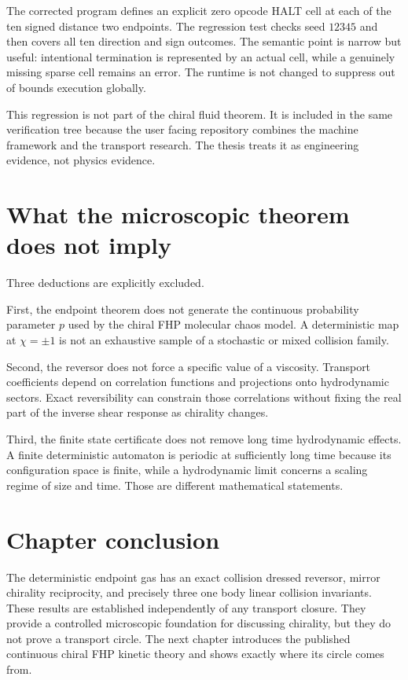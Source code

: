 The corrected program defines an explicit zero opcode HALT cell at each of the ten signed distance two endpoints. The regression test checks seed $12345$ and then covers all ten direction and sign outcomes. The semantic point is narrow but useful: intentional termination is represented by an actual cell, while a genuinely missing sparse cell remains an error. The runtime is not changed to suppress out of bounds execution globally.

This regression is not part of the chiral fluid theorem. It is included in the same verification tree because the user facing repository combines the machine framework and the transport research. The thesis treats it as engineering evidence, not physics evidence.

\section{What the microscopic theorem does not imply}
Three deductions are explicitly excluded.

First, the endpoint theorem does not generate the continuous probability parameter $p$ used by the chiral FHP molecular chaos model. A deterministic map at $\chi=\pm1$ is not an exhaustive sample of a stochastic or mixed collision family.

Second, the reversor does not force a specific value of a viscosity. Transport coefficients depend on correlation functions and projections onto hydrodynamic sectors. Exact reversibility can constrain those correlations without fixing the real part of the inverse shear response as chirality changes.

Third, the finite state certificate does not remove long time hydrodynamic effects. A finite deterministic automaton is periodic at sufficiently long time because its configuration space is finite, while a hydrodynamic limit concerns a scaling regime of size and time. Those are different mathematical statements.

\section{Chapter conclusion}
The deterministic endpoint gas has an exact collision dressed reversor, mirror chirality reciprocity, and precisely three one body linear collision invariants. These results are established independently of any transport closure. They provide a controlled microscopic foundation for discussing chirality, but they do not prove a transport circle. The next chapter introduces the published continuous chiral FHP kinetic theory and shows exactly where its circle comes from.
